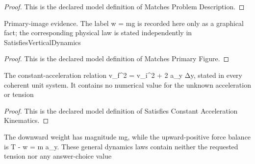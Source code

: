 \begin{proof}
  This is the declared model definition of Matches Problem Description.
\end{proof}
\begin{definition}
  \label{def:physics:phyx-mini-0802:phyxminiproblems-problemphyxmini0802-matchesprimaryfigure}
  Primary-image evidence. The label w = mg is recorded here only as a graphical fact; the corresponding physical law is stated independently in SatisfiesVerticalDynamics
\end{definition}
\begin{proof}
  This is the declared model definition of Matches Primary Figure.
\end{proof}
\begin{definition}
  \label{def:physics:phyx-mini-0802:phyxminiproblems-problemphyxmini0802-satisfiesconstantaccelerationkinematics}
  The constant-acceleration relation v\_f\textasciicircum{}2 = v\_i\textasciicircum{}2 + 2 a\_y Δy, stated in every coherent unit system. It contains no numerical value for the unknown acceleration or tension
\end{definition}
\begin{proof}
  This is the declared model definition of Satisfies Constant Acceleration Kinematics.
\end{proof}
\begin{definition}
  \label{def:physics:phyx-mini-0802:phyxminiproblems-problemphyxmini0802-satisfiesverticaldynamics}
  The downward weight has magnitude mg, while the upward-positive force balance is T - w = m a\_y. These general dynamics laws contain neither the requested tension nor any answer-choice value
\end{definition}
